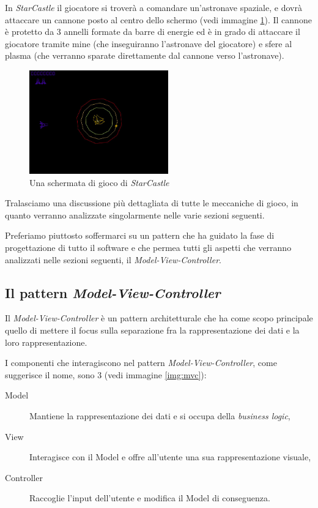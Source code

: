 \documentclass[a4paper,12pt]{article}
\begin{document}
In \emph{StarCastle} il giocatore si trover\`a a comandare un'astronave spaziale, e dovr\`a attaccare un cannone posto al centro dello schermo (vedi immagine \ref{img:screen}). Il cannone \`e protetto da 3 annelli formate da barre di energie ed \`e in grado di attaccare il giocatore tramite mine (che inseguiranno l'astronave del giocatore) e sfere al plasma (che verranno sparate direttamente dal cannone verso l'astronave). 

\begin{figure}
\centering
\includegraphics[width=6cm]{screen.jpg}
\caption{Una schermata di gioco di \emph{StarCastle}}
\label{img:screen}
\end{figure}

Tralasciamo una discussione pi\`u dettagliata di tutte le meccaniche di gioco, in quanto verranno analizzate singolarmente nelle varie sezioni seguenti.

Preferiamo piuttosto soffermarci su un pattern che ha guidato la fase di progettazione di tutto il software e che permea tutti gli aspetti che verranno analizzati nelle sezioni seguenti, il \emph{Model-View-Controller}.

\subsection*{Il pattern \emph{Model-View-Controller}}

Il \emph{Model-View-Controller} \`e un pattern architetturale che ha come scopo principale quello di mettere il focus sulla separazione fra la rappresentazione dei dati e la loro rappresentazione.

I componenti che interagiscono nel pattern \emph{Model-View-Controller}, come suggerisce il nome, sono 3 (vedi immagine \ref{img:mvc}):

\begin{description}
\item[\textsf{Model}] Mantiene la rappresentazione dei dati e si occupa della \emph{business logic},
\item[\textsf{View}] Interagisce con il \textsf{Model} e offre all'utente una sua rappresentazione visuale,
\item[\textsf{Controller}] Raccoglie l'input dell'utente e modifica il \textsf{Model} di conseguenza.
\end{description}
\end{document}
